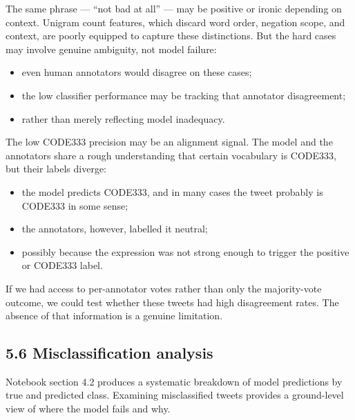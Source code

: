 \documentclass[12pt]{article}
\begin{document}
The same phrase --- ``not bad at all'' --- may be positive or ironic depending on context. Unigram count features, which discard word order, negation scope, and context, are poorly equipped to capture these distinctions. But the hard cases may involve genuine ambiguity, not model failure:

\begin{itemize}

  \item even human annotators would disagree on these cases;

  \item the low classifier performance may be tracking that annotator disagreement;

  \item rather than merely reflecting model inadequacy.

\end{itemize}



The low CODE333 precision may be an alignment signal. The model and the annotators share a rough understanding that certain vocabulary is CODE333, but their labels diverge:

\begin{itemize}

  \item the model predicts CODE333, and in many cases the tweet probably is CODE333 in some sense;

  \item the annotators, however, labelled it neutral;

  \item possibly because the expression was not strong enough to trigger the positive or CODE333 label.

\end{itemize} If we had access to per-annotator votes rather than only the majority-vote outcome, we could test whether these tweets had high disagreement rates. The absence of that information is a genuine limitation.



\subsection*{5.6 Misclassification analysis}



Notebook section 4.2 produces a systematic breakdown of model predictions by true and predicted class. Examining misclassified tweets provides a ground-level view of where the model fails and why.
\end{document}
